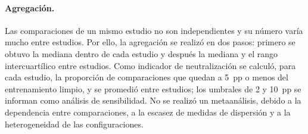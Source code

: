 \paragraph{Agregación.} Las comparaciones de un mismo estudio no son independientes y su número varía mucho entre estudios. Por ello, la agregación se realizó en dos pasos: primero se obtuvo la mediana dentro de cada estudio y después la mediana y el rango intercuartílico entre estudios. Como indicador de neutralización se calculó, para cada estudio, la proporción de comparaciones que quedan a 5~pp o menos del entrenamiento limpio, y se promedió entre estudios; los umbrales de 2 y 10~pp se informan como análisis de sensibilidad. No se realizó un metaanálisis, debido a la dependencia entre comparaciones, a la escasez de medidas de dispersión y a la heterogeneidad de las configuraciones.
